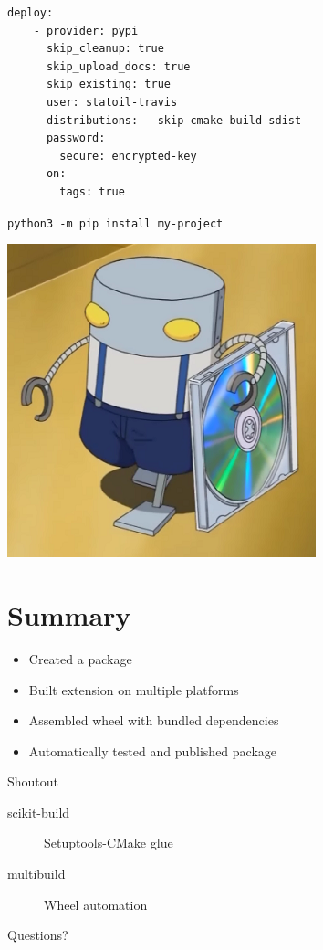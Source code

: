 \documentclass[pdf]{beamer}
\begin{document}
\begin{frame}[fragile]
    \begin{verbatim}
deploy:
    - provider: pypi
      skip_cleanup: true
      skip_upload_docs: true
      skip_existing: true
      user: statoil-travis
      distributions: --skip-cmake build sdist
      password:
        secure: encrypted-key
      on:
        tags: true
    \end{verbatim}
\end{frame}

\begin{frame}[fragile]
    \verb|python3 -m pip install my-project|
\end{frame}

\begin{frame}
    \begin{center}
        \includegraphics[height = 0.8\textheight]{mechazawa-dist.png}
    \end{center}
\end{frame}

\section{Summary}

\begin{frame}
    \begin{itemize}
        \item Created a package
        \item Built extension on multiple platforms
        \item Assembled wheel with bundled dependencies
        \item Automatically tested and published package
    \end{itemize}
\end{frame}

\begin{frame}{Shoutout}
    \begin{description}
        \item [scikit-build] Setuptools-CMake glue
        \item [multibuild] Wheel automation
    \end{description}
\end{frame}

\begin{frame}
    Questions?
\end{frame}
\end{document}
